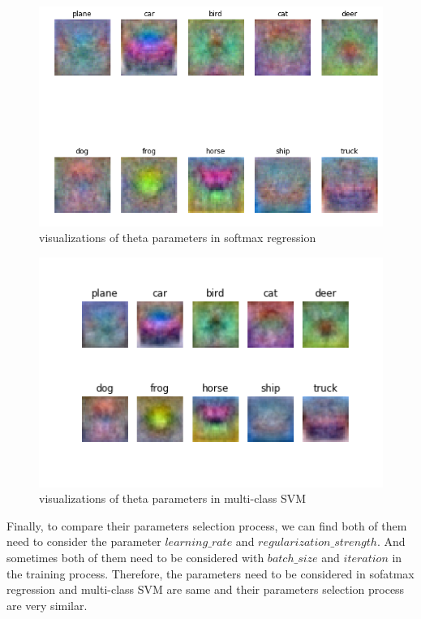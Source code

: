 \documentclass[paper=a4, fontsize=11pt]{scrartcl} %
\numberwithin{equation}{section} %
\numberwithin{figure}{section} %
\numberwithin{table}{section} %
\begin{document}
\begin{figure}[H]
 	\centering
 	\includegraphics[scale=0.36]{./../softmax_theta}
 	\caption{visualizations of theta parameters in softmax regression}
 	\label{fig:softmax_theta}
\end{figure}
\begin{figure}[H]
 	\centering
 	\includegraphics[scale=0.6]{./../multiclass_svm_theta.png}
 	\caption{visualizations of theta parameters in multi-class SVM}
 	\label{fig:SVM_theta}
\end{figure}

Finally, to compare their parameters selection process, we can find both of them need to consider the parameter $learning\_rate$ and $regularization\_strength$. And sometimes both of them need to be considered with $batch\_size$ and $iteration$ in the training process. Therefore, the parameters need to be considered in sofatmax regression and multi-class SVM are same and their parameters selection process are very similar.
\end{document}
